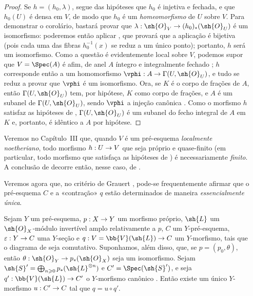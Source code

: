 \documentclass[oneside,10pt]{amsart}
\makeatletter
\renewcommand{\geq}{\geqslant}
\newcommand{\ega@arrow}[2]{\mathchoice{#1}{#2}{#2}{#2}}
\renewcommand{\to}{\ega@arrow{\longrightarrow}{\rightarrow}}
\newcommand{\oldpage}[2][]{\marginnote{\normalfont\footnotesize\textbf{#1}~|~#2}\ignorespaces}
\let\EGAOriginalLabel\label
\renewcommand{\label}[1]{\phantomsection\EGAOriginalLabel{#1}}
\makeatother
\begin{document}
\begin{proof}
Se $h=(h_0,\lambda)$, segue das hipóteses que $h_0$ é injetiva e fechada, e que $h_0(U)$
\oldpage[II]{190}
é densa em $V$, de modo que $h_0$ é um \emph{homeomorfismo} de $U$ sobre $V$.
Para demonstrar o corolário, bastará provar que $\lambda:\sh{O}_V\to(h_0)_*(\sh{O}_U)$ é um isomorfismo: poderemos então aplicar , que provará que a aplicação  é bijetiva (pois cada uma das fibras $h_0^{-1}(x)$ se reduz a um único ponto);
portanto, $h$ será um isomorfismo.
Como a questão é evidentemente local sobre $V$, podemos supor que $V=\Spec(A)$ é afim, de anel $A$ íntegro e integralmente fechado ;
$h$ corresponde então  a um homomorfismo $\vphi:A\to\Gamma(U,\sh{O}_U)$, e tudo se reduz a provar que $\vphi$ é um isomorfismo.
Ora, se $K$ é o corpo de frações de $A$, então $\Gamma(U,\sh{O}_U)$ tem, por hipótese, $K$ como corpo de frações, e $A$ é um subanel de $\Gamma(U,\sh{O}_U)$, sendo $\vphi$ a injeção canônica .
Como o morfismo $h$ satisfaz as hipóteses de , $\Gamma(U,\sh{O}_U)$ é um subanel do fecho integral de $A$ em $K$ e, portanto, é idêntico a $A$ por hipótese.
\end{proof}

\begin{remark}[8.11.3]
\label{II.8.11.3}
Veremos no Capítulo~III  que, quando $V$ é um pré-esquema \emph{localmente noetheriano}, todo morfismo $h:U\to V$ que seja próprio e quase-finito (em particular, todo morfismo que satisfaça as hipóteses de ) é necessariamente \emph{finito}.
A conclusão de  decorre então, nesse caso, de .
\end{remark}

\begin{env}[8.11.4]
\label{II.8.11.4}
Veremos agora que, no critério de Grauert , pode-se frequentemente afirmar que o pré-esquema $C$ e a «contração» $q$ estão determinados de maneira \emph{essencialmente única}.
\end{env}

\begin{lemma}[8.11.5]
\label{II.8.11.5}
Sejam $Y$ um pré-esquema, $p:X\to Y$ um morfismo próprio, $\sh{L}$ um $\sh{O}_X$-módulo invertível amplo relativamente a $p$, $C$ um $Y$-pré-esquema, $\varepsilon:Y\to C$ uma $Y$-seção e $q:V=\bb{V}(\sh{L})\to C$ um $Y$-morfismo, tais que o diagrama de  seja comutativo.
Suponhamos, além disso, que, se $p=(p_0,\theta)$, então $\theta:\sh{O}_Y\to p_*(\sh{O}_X)$ seja um isomorfismo.
Sejam $\sh{S}'=\bigoplus_{n\geq0}p_*(\sh{L}^{\otimes n})$ e $C'=\Spec(\sh{S}')$, e seja $q':\bb{V}(\sh{L})\to C'$ o $Y$-morfismo canônico .
Então existe um único $Y$-morfismo $u:C'\to C$ tal que $q=u\circ q'$.
\end{lemma}
\end{document}
